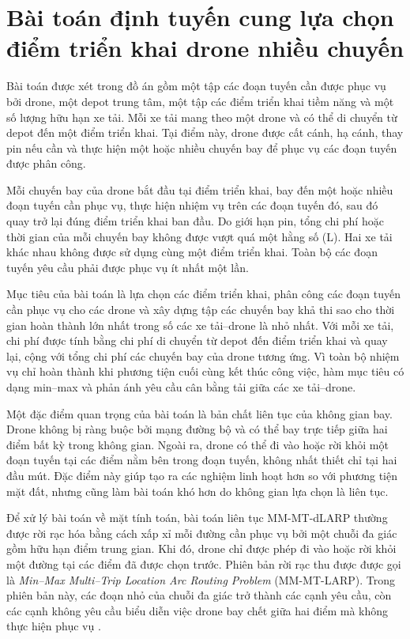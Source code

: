 \section{Bài toán định tuyến cung lựa chọn điểm triển khai drone nhiều chuyến}

Bài toán được xét trong đồ án gồm một tập các đoạn tuyến cần được phục vụ bởi drone, một depot trung tâm, một tập các điểm triển khai tiềm năng và một số lượng hữu hạn xe tải. Mỗi xe tải mang theo một drone và có thể di chuyển từ depot đến một điểm triển khai. Tại điểm này, drone được cất cánh, hạ cánh, thay pin nếu cần và thực hiện một hoặc nhiều chuyến bay để phục vụ các đoạn tuyến được phân công.

Mỗi chuyến bay của drone bắt đầu tại điểm triển khai, bay đến một hoặc nhiều đoạn tuyến cần phục vụ, thực hiện nhiệm vụ trên các đoạn tuyến đó, sau đó quay trở lại đúng điểm triển khai ban đầu. Do giới hạn pin, tổng chi phí hoặc thời gian của mỗi chuyến bay không được vượt quá một hằng số (L). Hai xe tải khác nhau không được sử dụng cùng một điểm triển khai. Toàn bộ các đoạn tuyến yêu cầu phải được phục vụ ít nhất một lần.

Mục tiêu của bài toán là lựa chọn các điểm triển khai, phân công các đoạn tuyến cần phục vụ cho các drone và xây dựng tập các chuyến bay khả thi sao cho thời gian hoàn thành lớn nhất trong số các xe tải--drone là nhỏ nhất. Với mỗi xe tải, chi phí được tính bằng chi phí di chuyển từ depot đến điểm triển khai và quay lại, cộng với tổng chi phí các chuyến bay của drone tương ứng. Vì toàn bộ nhiệm vụ chỉ hoàn thành khi phương tiện cuối cùng kết thúc công việc, hàm mục tiêu có dạng min--max và phản ánh yêu cầu cân bằng tải giữa các xe tải--drone.

Một đặc điểm quan trọng của bài toán là bản chất liên tục của không gian bay. Drone không bị ràng buộc bởi mạng đường bộ và có thể bay trực tiếp giữa hai điểm bất kỳ trong không gian. Ngoài ra, drone có thể đi vào hoặc rời khỏi một đoạn tuyến tại các điểm nằm bên trong đoạn tuyến, không nhất thiết chỉ tại hai đầu mút. Đặc điểm này giúp tạo ra các nghiệm linh hoạt hơn so với phương tiện mặt đất, nhưng cũng làm bài toán khó hơn do không gian lựa chọn là liên tục.

Để xử lý bài toán về mặt tính toán, bài toán liên tục MM-MT-dLARP thường được rời rạc hóa bằng cách xấp xỉ mỗi đường cần phục vụ bởi một chuỗi đa giác gồm hữu hạn điểm trung gian. Khi đó, drone chỉ được phép đi vào hoặc rời khỏi một đường tại các điểm đã được chọn trước. Phiên bản rời rạc thu được được gọi là \textit{Min--Max Multi--Trip Location Arc Routing Problem} (MM-MT-LARP). Trong phiên bản này, các đoạn nhỏ của chuỗi đa giác trở thành các cạnh yêu cầu, còn các cạnh không yêu cầu biểu diễn việc drone bay chết giữa hai điểm mà không thực hiện phục vụ \cite{corberan2025mmdlarp}.

